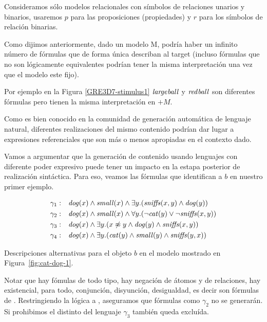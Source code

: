 
Consideramos s\'olo modelos relacionales con s\'imbolos de relaciones unarios y binarios, usaremos $p$ para las proposiciones (propiedades) y $r$ para los s\'imbolos de relaci\'on binarias.


Como dijimos anteriormente, dado un modelo M, podr\'ia haber un infinito n\'umero de f\'ormulas que de forma \'unica
describan al target (incluso f\'ormulas que no son l\'ogicamente equivalentes podr\'ian tener
la misma interpretaci\'on una vez que el modelo este fijo). 

Por ejemplo en la Figura \ref{GRE3D7-stimulus1} $\mathit{large} \mathit{ball}$ y $\mathit{red} \mathit{ball}$ son diferentes f\'ormulas pero tienen la misma interpretaci\'on en $+M$.

Como es bien conocido en la comunidad de generaci\'on autom\'atica de lenguaje natural, diferentes
realizaciones del mismo contenido podr\'ian dar lugar a expresiones referenciales que son m\'as o menos
apropiadas en el contexto dado. 

Vamos a argumentar que la generaci\'on de contenido usando lenguajes con diferente poder expresivo puede tener un impacto en la estapa posterior de realizaci\'on sint\'actica. Para eso, veamos las f\'ormulas que identifican a $b$ en nuestro primer ejemplo.

\begin{table}
$$
\begin{array}{cl}
 \gamma_1: & \mathit{dog}(x) \land \mathit{small}(x) \land
   \exists y . (\mathit{sniffs}(x,y) \land \mathit{dog}(y))\\[3pt]
  \gamma_2: & \mathit{dog}(x) \land \mathit{small}(x) \land
  \forall y . (\neg \mathit{cat}(y) \lor \neg \mathit{sniffs}(x,y))\\[3pt]
  \gamma_3: & \mathit{dog}(x) \land
  \exists y . (x \not\approx y \land \mathit{dog}(y)  \land \mathit{sniffs}(x,y))\\[3pt]
  \gamma_4: & \mathit{dog}(x) \land
  \exists y . (\mathit{cat}(y) \land \mathit{small}(y) \land \mathit{sniffs}(y,x))
 \end{array}
$$
\caption{Descripciones alternativas para el objeto $b$ en el modelo mostrado en Figura~\ref{fig:cat-dog-1}.}\label{tab:gammas}
\end{table}

Notar que hay f\'omulas de todo tipo, hay negaci\'on de \'atomos y de relaciones, hay existencial, para todo, conjunci\'on, disyunci\'on, desigualdad, es decir son f\'ormulas de \FOL.
Restringiendo la l\'ogica a \EPFOL, aseguramos que f\'ormulas como  $\gamma_2$ no se generar\'an. Si prohibimos el distinto del lenguaje  $\gamma_3$ tambi\'en queda exclu\'ida.

